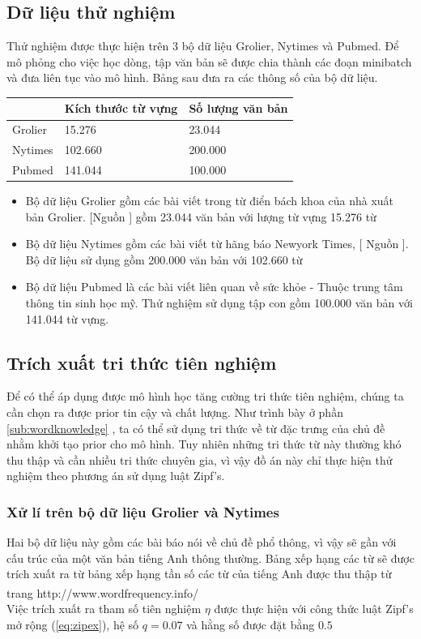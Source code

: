 \documentclass[fontsize=13pt]{scrartcl}
\begin{document}
\subsection{Dữ liệu thử nghiệm}
Thử nghiệm được thực hiện trên 3 bộ dữ liệu Grolier, Nytimes và Pubmed. Để mô phỏng cho việc học dòng, tập văn bản sẽ được chia thành các đoạn minibatch và đưa liên tục vào mô hình. Bảng sau đưa ra các thông số của bộ dữ liệu.
\begin{table}[H]
\begin{center}
\begin{tabular}{|l|l|l|}
\hline
& Kích thước từ vựng & Số lượng văn bản \\
\hline
Grolier & 15.276 & 23.044\\
\hline
Nytimes & 102.660 & 200.000 \\
\hline
Pubmed & 141.044 & 100.000\\
\hline 
\end{tabular}
\end{center}
\end{table}
\begin{itemize}
\item Bộ dữ liệu Grolier gồm các bài viết trong từ điển bách khoa của nhà xuất bản Grolier. [Nguồn ] gồm 23.044 văn bản với lượng từ vựng 15.276 từ
\item Bộ dữ liệu Nytimes gồm các bài viết từ hãng báo Newyork Times, [ Nguồn ]. Bộ dữ liệu sử dụng gồm 200.000 văn bản với 102.660 từ
\item Bộ dữ liệu Pubmed là các bài viết liên quan về sức khỏe - Thuộc trung tâm thông tin sinh học mỹ. Thử nghiệm sử dụng tập con gồm 100.000 văn bản với 141.044 từ vựng.
\end{itemize}
\subsection{Trích xuất tri thức tiên nghiệm}
Để có thể áp dụng được mô hình học tăng cường tri thức tiên nghiệm, chúng ta cần chọn ra được prior tin cậy và chất lượng. Như trình bày ở phần \ref{sub:wordknowledge} , ta có thể sử dụng tri thức về từ đặc trưng của chủ đề nhằm khởi tạo prior cho mô hình. Tuy nhiên những tri thức từ này thường khó thu thập và cần nhiều tri thức chuyên gia, vì vậy đồ án này chỉ thực hiện thử nghiệm theo phương án sử dụng luật Zipf's.
\subsubsection{Xử lí trên bộ dữ liệu Grolier và Nytimes}
Hai bộ dữ liệu này gồm các bài báo nói về chủ đề phổ thông, vì vậy sẽ gần với cấu trúc của một văn bản tiếng Anh thông thường. Bảng xếp hạng các từ sẽ được trích xuất ra từ bảng xếp hạng tần số các từ của tiếng Anh được thu thập từ trang http://www.wordfrequency.info/\textsuperscript{\cite{listfrequencyword}} \\
Việc trích xuất ra tham số tiên nghiệm $\eta$ được thực hiện với công thức luật Zipf's mở rộng (\ref{eq:zipex}), hệ số $q = 0.07$ và hằng số được đặt bằng $0.5$
\end{document}
